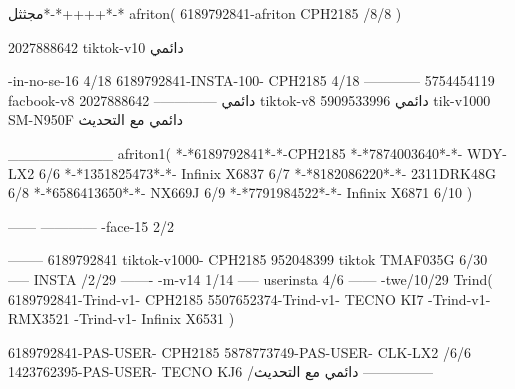 مجثثل*-*++++*-*
afriton(
6189792841-afriton CPH2185  /8/8
)

2027888642 tiktok-v10
دائمي

-in-no-se-16 4/18
6189792841-INSTA-100- CPH2185 4/18
------------
5754454119 facbook-v8
دائمي
--------------
2027888642 tiktok-v8
دائمي
5909533996 tik-v1000  SM-N950F
دائمي مع التحديث

__________
afriton1(
*-*6189792841*-*-CPH2185
*-*7874003640*-*- WDY-LX2  6/6
*-*1351825473*-*- Infinix X6837  6/7
*-*8182086220*-*- 2311DRK48G  6/8
*-*6586413650*-*- NX669J  6/9
*-*7791984522*-*- Infinix X6871  6/10
)


------
------------
-face-15 2/2

--------
6189792841 tiktok-v1000- CPH2185 
952048399 tiktok TMAF035G  6/30
-----
 INSTA /2/29
-------
-m-v14 1/14
-----
userinsta 4/6
------
-twe/10/29
Trind(
6189792841-Trind-v1- CPH2185 
5507652374-Trind-v1- TECNO KI7 \6-Trind-v1- RMX3521 \6-Trind-v1-  Infinix X6531 \6\8
)


6189792841-PAS-USER- CPH2185 
5878773749-PAS-USER- CLK-LX2  /6/6
1423762395-PAS-USER- TECNO KJ6  /دائمي مع التحديث
    ---------------

